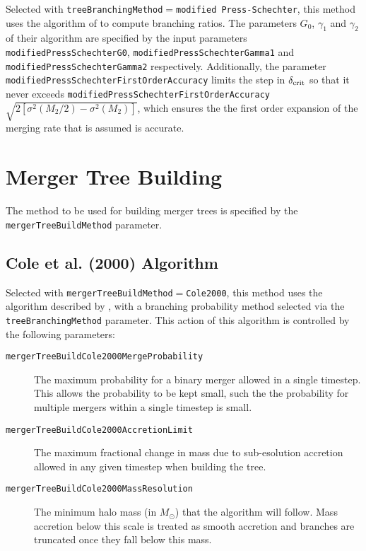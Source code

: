 Selected with {\tt treeBranchingMethod}$=${\tt modified Press-Schechter}, this method uses the algorithm of \cite{parkinson_generating_2008} to compute branching ratios. The parameters $G_0$, $\gamma_1$ and $\gamma_2$ of their algorithm are specified by the input parameters {\tt modifiedPressSchechterG0}, {\tt modifiedPressSchechterGamma1} and {\tt modifiedPressSchechterGamma2} respectively. Additionally, the parameter {\tt modifiedPressSchechterFirstOrderAccuracy} limits the step in $\delta_{\rm crit}$ so that it never exceeds {\tt modifiedPressSchechterFirstOrderAccuracy}$\sqrt{2[\sigma^2(M_2/2)-\sigma^2(M_2)]}$, which ensures the the first order expansion of the merging rate that is assumed is accurate.

\section{Merger Tree Building}

The method to be used for building merger trees is specified by the {\tt mergerTreeBuildMethod} parameter.

\subsection{Cole et al. (2000) Algorithm}

Selected with {\tt mergerTreeBuildMethod}$=${\tt Cole2000}, this method uses the algorithm described by \cite{cole_hierarchical_2000}, with a branching probability method selected via the {\tt treeBranchingMethod} parameter. This action of this algorithm is controlled by the following parameters:
\begin{description}
 \item [{\tt mergerTreeBuildCole2000MergeProbability}] The maximum probability for a binary merger allowed in a single timestep. This allows the probability to be kept small, such the the probability for multiple mergers within a single timestep is small.
 \item [{\tt mergerTreeBuildCole2000AccretionLimit}] The maximum fractional change in mass due to sub-esolution accretion allowed in any given timestep when building the tree.
 \item [{\tt mergerTreeBuildCole2000MassResolution}] The minimum halo mass (in $M_\odot$) that the algorithm will follow. Mass accretion below this scale is treated as smooth accretion and branches are truncated once they fall below this mass.
\end{description}

